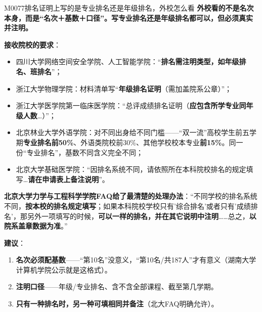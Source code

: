\begin{qa}{M0077}{排名证明上写的是专业排名还是年级排名，外校怎么看}
\textbf{外校看的不是名次本身，而是“名次＋基数＋口径”。写专业排名还是年级排名都可以，但必须真实并注明。}

\textbf{接收院校的要求}：
\begin{itemize}
  \item 四川大学网络空间安全学院、人工智能学院：“\textbf{排名需注明类型，如年级排名、班排名}”；
  \item 浙江大学物理学院：材料清单写“\textbf{年级排名证明}（需加盖院系公章）”；
  \item 浙江大学医学院第一临床医学院：“总评成绩排名证明（\textbf{应包含所学专业同年级人数}…）”；
  \item 北京林业大学外语学院：对不同出身给不同门槛——“双一流”高校学生前五学期\textbf{专业排名前50\%}、外语类院校前30\%、其他学校校本专业\textbf{前15\%}。同一份“专业排名”，基数不同含义完全不同；
  \item 北京大学基础医学院：“因排名系统不同，请依照所在本科院校排名的规定填写…\textbf{请在申请表上备注说明}”。
\end{itemize}

\textbf{北京大学力学与工程科学学院FAQ给了最清楚的处理办法}：“不同学校的排名系统不同，\textbf{按本校的排名规定填写}；如果本科院校学校只有'综合排名'或者只有'成绩排名'，那另外一项填写的时候，\textbf{可以一样的排名，并在其它说明中注明}……总之，\textbf{以院系盖章数据为准}。”

\textbf{建议}：
\begin{enumerate}
  \item \textbf{名次必须配基数}——“第10名”没意义，“第10名/共187人”才有意义（湖南大学计算机学院公示就是这格式）。
  \item \textbf{注明口径}——年级/专业排名、含不含全部课程、截至第几学期。
  \item \textbf{只有一种排名时，另一种可填相同并备注}（北大FAQ明确允许）。
\end{enumerate}
\end{qa}


